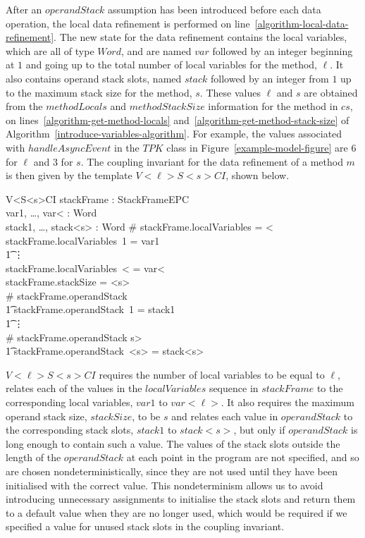 After an $operandStack$ assumption has been introduced before each
data operation, the local data refinement is performed on
line~\ref{algorithm-local-data-refinement}.
The new state for the data refinement contains the local variables,
which are all of type $Word$, and are named $var$ followed by an
integer beginning at $1$ and going up to the total number of local
variables for the method, $\ell$.
It also contains operand stack slots, named $stack$ followed by an
integer from $1$ up to the maximum stack size for the method, $s$.
These values $\ell$ and $s$ are obtained from the $methodLocals$ and
$methodStackSize$ information for the method in $cs$, on
lines~\ref{algorithm-get-method-locals}
and~\ref{algorithm-get-method-stack-size} of
Algorithm~\ref{introduce-variables-algorithm}.
For example, the values associated with $handleAsyncEvent$ in the
$TPK$ class in Figure~\ref{example-model-figure} are $6$ for $\ell$
and $3$ for $s$. 
The coupling invariant for the data refinement of a method $m$ is then
given by the template $V{<}\ell{>}S{<}s{>}CI$, shown below.

\begin{schema}{V{<}\ell{>}S{<}s{>}CI}
  stackFrame : StackFrameEPC \\
  var1, \ldots, var{<}\ell{>} : Word \\
  stack1, \ldots, stack{<}s{>} : Word
\where
  \# stackFrame.localVariables = {<}\ell{>} \\
  stackFrame.localVariables~1 = var1 \\
  \t1 \vdots \\
  stackFrame.localVariables~{<}\ell{>} = var{<}\ell{>} \\
  stackFrame.stackSize = {<}s{>} \\
  \# stackFrame.operandStack  \implies \\
  \t1 stackFrame.operandStack~1 = stack1 \\
  \t1 \vdots \\
  \# stackFrame.operandStack \geq {<}s{>} \implies \\
  \t1 stackFrame.operandStack~{<}s{>} = stack{<}s{>}
\end{schema}

$V{<}\ell{>}S{<}s{>}CI$ requires the number of local variables to be
equal to $\ell$, relates each of the values in the
$localVariables$ sequence in $stackFrame$ to the corresponding local
variables, $var1$ to $var{<}\ell{>}$.
It also requires the maximum operand stack size, $stackSize$, to be
$s$\added{,} and relates each value in $operandStack$ to the
corresponding stack slots, $stack1$ to $stack{<}s{>}$, but only if
$operandStack$ is long enough to contain such a value.
The values of the stack slots outside the length of the $operandStack$
at each point in the program are not specified, and so are chosen
nondeterministically, since they are not used until they have been
initialised with the correct value.
This nondeterminism allows us to avoid introducing unnecessary
assignments to initialise the stack slots and return them to a default
value when they are no longer used, which would be required if we
specified a value for unused stack slots in the coupling invariant.

